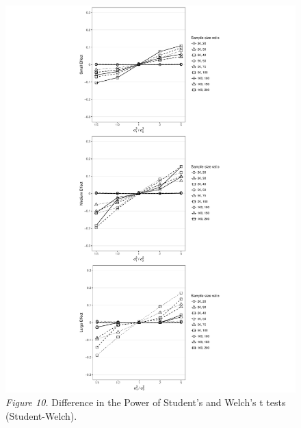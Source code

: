 \documentclass[man,a4paper,noextraspace,apacite]{apa6}
\begin{document}
\begin{figure}
\includegraphics{WelchManuscript-MASTER-plotPowerDiff}
\textit{Figure 10.} Difference in the Power of Student's and Welch's t tests (Student-Welch).
\end{figure}
\end{document}
